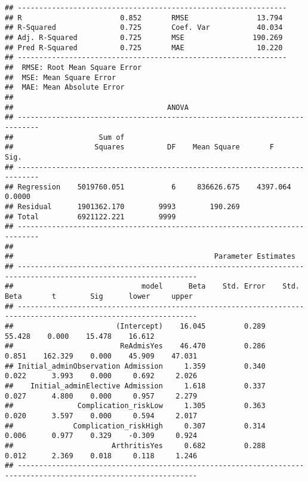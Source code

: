 \documentclass[
]{article}
\begin{document}
\begin{verbatim}
## ---------------------------------------------------------------
## R                       0.852       RMSE                13.794 
## R-Squared               0.725       Coef. Var           40.034 
## Adj. R-Squared          0.725       MSE                190.269 
## Pred R-Squared          0.725       MAE                 10.220 
## ---------------------------------------------------------------
##  RMSE: Root Mean Square Error 
##  MSE: Mean Square Error 
##  MAE: Mean Absolute Error 
## 
##                                    ANOVA                                    
## ---------------------------------------------------------------------------
##                    Sum of                                                  
##                   Squares          DF    Mean Square       F          Sig. 
## ---------------------------------------------------------------------------
## Regression    5019760.051           6     836626.675    4397.064    0.0000 
## Residual      1901362.170        9993        190.269                       
## Total         6921122.221        9999                                      
## ---------------------------------------------------------------------------
## 
##                                               Parameter Estimates                                                
## ----------------------------------------------------------------------------------------------------------------
##                              model      Beta    Std. Error    Std. Beta       t        Sig      lower     upper 
## ----------------------------------------------------------------------------------------------------------------
##                        (Intercept)    16.045         0.289                  55.428    0.000    15.478    16.612 
##                         ReAdmisYes    46.470         0.286        0.851    162.329    0.000    45.909    47.031 
## Initial_adminObservation Admission     1.359         0.340        0.022      3.993    0.000     0.692     2.026 
##    Initial_adminElective Admission     1.618         0.337        0.027      4.800    0.000     0.957     2.279 
##               Complication_riskLow     1.305         0.363        0.020      3.597    0.000     0.594     2.017 
##              Complication_riskHigh     0.307         0.314        0.006      0.977    0.329    -0.309     0.924 
##                       ArthritisYes     0.682         0.288        0.012      2.369    0.018     0.118     1.246 
## ----------------------------------------------------------------------------------------------------------------

\end{verbatim}
\end{document}
